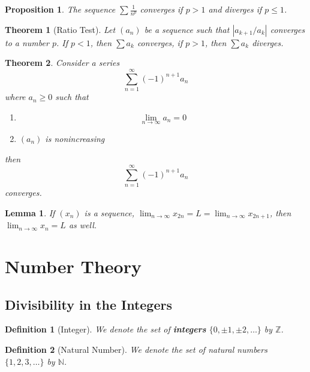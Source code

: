 \documentclass[12pt]{article}
\newtheorem{definition}{Definition}[subsection]
\newtheorem{theorem}{Theorem}[subsection]
\newtheorem{proposition}{Proposition}[subsection]
\newtheorem{lemma}{Lemma}[subsection]
\begin{document}
			\begin{proposition}
				The sequence $\sum \frac{1}{n^p}$ converges if $p > 1$ and diverges if $p \leq 1$.
			\end{proposition}
			
			\begin{theorem}[Ratio Test]
				Let $(a_n)$ be a sequence such that $|a_{k + 1}/a_k|$ converges to a number $p$. If $p < 1$, then $\sum a_k$ converges, if $p > 1$, then $\sum a_k$ diverges.
			\end{theorem}
			
			\begin{theorem}
				Consider a series
				\[\sum_{n = 1}^\infty (-1)^{n + 1}a_n\] where $a_n \geq 0$ such that
				\begin{enumerate}
					\item \[\lim_{n \rightarrow \infty} a_n = 0\]
					\item $(a_n)$ is nonincreasing
				\end{enumerate}
				then \[\sum_{n = 1}^\infty (-1)^{n + 1}a_n\] converges.
			\end{theorem}
			
			
			\begin{lemma}
				If $(x_n)$ is a sequence, $\lim_{n\rightarrow \infty}x_{2n} = L = \lim_{n\rightarrow \infty}x_{2n + 1}$, then $\lim_{n\rightarrow \infty}x_n = L$ as well.
			\end{lemma}
			
		\section{Number Theory}
		\subsection{Divisibility in the Integers}

    \begin{definition}[Integer]
        We denote the set of \textbf{integers} $\{0, \pm1, \pm2, \hdots\}$ by $\mathbb{Z}$.
    \end{definition}
    \begin{definition}[Natural Number]
     We denote the set of natural numbers $\{1,2,3,\hdots\}$ by $\mathbb{N}$.
    \end{definition}
\end{document}

